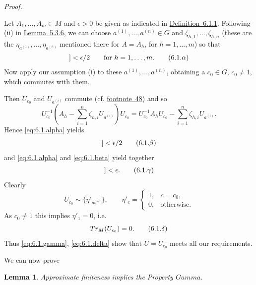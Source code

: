 \documentclass[b5paper,twoside]{article}
\newcommand{\lemref}[2]{\hyperref[#1]{\mbox{Lemma~#2}}}
\newcommand{\defref}[2]{\hyperref[#1]{\mbox{Definition~#2}}}
\theoremstyle{mvnplain}
\newtheorem{lemma}{Lemma}[section]
\renewenvironment{proof}[1][Proof]{%
  \par\addvspace{0.35\baselineskip}%
  \noindent\textit{#1.}\ \normalfont\ignorespaces
}{%
  \par\addvspace{0.35\baselineskip}%
}
\newcommand{\M}{\mathbf M}
\newcommand{\Metric}[1]{\left[\!\left[#1\right]\!\right]}
\def\M{M}%
\def\Metric#1{[[#1]]}%
\def\Gamma{Gamma}%
\def\operatorname#1{#1}%
\def\mathfrak#1{#1}%
\begin{document}
\begin{proof}
Let $A_1,\ldots,A_m\in\M$ and $\epsilon>0$ be given as indicated in
\defref{def:6.1.1}{6.1.1}. Following (ii) in \lemref{lem:5.3.6}{5.3.6}, we
can choose $a^{(1)},\ldots,a^{(n)}\in\mathfrak G$ and
$\zeta_{h,1},\ldots,\zeta_{h,n}$ (these are the
$\eta_{a^{(1)}},\ldots,\eta_{a^{(n)}}$ mentioned there for $A=A_h$, for
$h=1,\ldots,m$) so that
\begin{equation}
  \Metric{A_h-\sum_{i=1}^{n}\zeta_{h,i}U_{a^{(i)}}}<\epsilon/2
  \qquad\text{for }h=1,\ldots,m.
  \tag{6.1.\ensuremath{\alpha}}\label{eq:6.1.alpha}
\end{equation}
Now apply our assumption (i) to these $a^{(1)},\ldots,a^{(n)}$, obtaining a
$c_0\in\mathfrak G$, $c_0\ne1$, which commutes with them.

Then $U_{c_0}$ and $U_{a^{(i)}}$ commute
(cf. \hyperref[fn:48]{footnote~48}) and so
\[
  U_{c_0}^{-1}\left(A_h-\sum_{i=1}^{n}\zeta_{h,i}U_{a^{(i)}}\right)U_{c_0}
  =U_{c_0}^{-1}A_hU_{c_0}-\sum_{i=1}^{n}\zeta_{h,i}U_{a^{(i)}}.
\]
Hence \eqref{eq:6.1.alpha} yields
\begin{equation}
  \Metric{U_{c_0}^{-1}A_hU_{c_0}
  -\sum_{i=1}^{n}\zeta_{h,i}U_{a^{(i)}}}<\epsilon/2
  \tag{6.1.\ensuremath{\beta}}\label{eq:6.1.beta}
\end{equation}
and \eqref{eq:6.1.alpha} and \eqref{eq:6.1.beta} yield together
\begin{equation}
  \Metric{U_{c_0}^{-1}A_hU_{c_0}-A_h}<\epsilon.
  \tag{6.1.\ensuremath{\gamma}}\label{eq:6.1.gamma}
\end{equation}
Clearly
\[
  U_{c_0}\sim\{\eta'_{ab^{-1}}\},
  \qquad
  \eta'_c=
  \begin{cases}
    1,&c=c_0,\\
    0,&\text{otherwise}.
  \end{cases}
\]
As $c_0\ne1$ this implies $\eta'_1=0$, i.e.
\begin{equation}
  \operatorname{Tr}_{\M}(U_{c_0})=0.
  \tag{6.1.\ensuremath{\delta}}\label{eq:6.1.delta}
\end{equation}
Thus \eqref{eq:6.1.gamma}, \eqref{eq:6.1.delta} show that $U=U_{c_0}$ meets
all our requirements.
\end{proof}

We can now prove
\begin{lemma}\label{lem:6.1.2}
Approximate finiteness implies the Property $\Gamma$.
\end{lemma}
\end{document}
